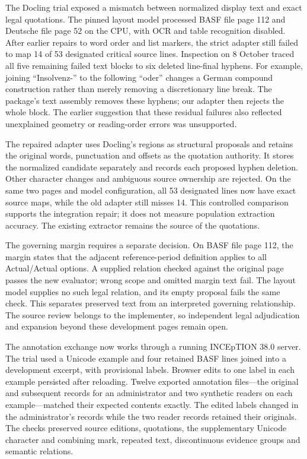 The Docling trial exposed a mismatch between normalized display text and exact
legal quotations. The pinned layout model processed BASF file page 112 and
Deutsche file page 52 on the CPU, with OCR and table recognition disabled.
After earlier repairs to word order and list markers, the strict adapter still
failed to map 14 of 53 designated critical source lines. Inspection on 8 October
traced all five remaining failed text blocks to six deleted line-final hyphens.
For example, joining ``Insolvenz-'' to the following ``oder'' changes a German
compound construction rather than merely removing a discretionary line break.
The package's text assembly removes these hyphens; our adapter then rejects the
whole block. The earlier suggestion that these residual failures also reflected
unexplained geometry or reading-order errors was unsupported.

The repaired adapter uses Docling's regions as structural proposals and retains
the original words, punctuation and offsets as the quotation authority. It stores
the normalized candidate separately and records each proposed hyphen deletion.
Other character changes and ambiguous source ownership are rejected. On the
same two pages and model configuration, all 53 designated lines now have exact
source maps, while the old adapter still misses 14. This controlled comparison
supports the integration repair; it does not measure population extraction
accuracy. The existing extractor remains the source of the quotations.

The governing margin requires a separate decision. On BASF file page 112, the
margin states that the adjacent reference-period definition applies to all
Actual/Actual options. A supplied relation checked against the original page
passes the new evaluator; wrong scope and omitted margin text fail. The layout
model supplies no such legal relation, and its empty proposal fails the same
check. This separates preserved text from an interpreted governing relationship.
The source review belongs to the implementer, so independent legal adjudication
and expansion beyond these development pages remain open.

The annotation exchange now works through a running INCEpTION 38.0 server.
The trial used a Unicode example and four retained BASF lines joined into a
development excerpt, with provisional labels. Browser edits to one label in
each example persisted after reloading. Twelve exported annotation files---the
original and subsequent records for an administrator and two synthetic readers
on each example---matched their expected contents exactly. The edited labels
changed in the administrator's records while the two reader records retained
their originals. The checks preserved source editions, quotations, the
supplementary Unicode character and combining mark, repeated text,
discontinuous evidence groups and semantic relations.

